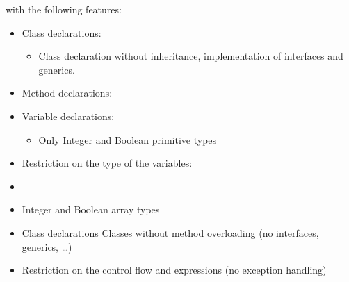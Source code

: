 \documentclass{report}
\begin{document}
 with the following features:
\begin{itemize}
\item Class declarations:
  \begin{itemize}
  \item Class declaration without inheritance, implementation of interfaces and generics.
  \end{itemize}
\item Method declarations:
  \begin{itemize}
    
  \end{itemize}
\item Variable declarations:
  \begin{itemize}
  \item Only Integer and Boolean primitive types
  \end{itemize}
\item Restriction on the type of the variables:
\item 
\item Integer and Boolean array types
\item Class declarations
Classes without method overloading (no interfaces, generics, \ldots)
\item Restriction on the control flow and expressions (no exception handling)
\end{itemize}
\end{document}
